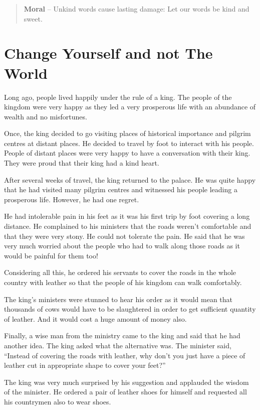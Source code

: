 \documentclass[oneside,12pt]{article}
\begin{document}
\begin{quote}
\textbf{Moral} – Unkind words cause lasting damage: Let our words be kind and sweet.
\end{quote}

\section{Change Yourself and not The World}
Long ago, people lived happily under the rule of a king. The people of the kingdom were very happy as they led a very prosperous life with an abundance of wealth and no misfortunes.

Once, the king decided to go visiting places of historical importance and pilgrim centres at distant places. He decided to travel by foot to interact with his people. People of distant places were very happy to have a conversation with their king. They were proud that their king had a kind heart.

After several weeks of travel, the king returned to the palace. He was quite happy that he had visited many pilgrim centres and witnessed his people leading a prosperous life. However, he had one regret.

He had intolerable pain in his feet as it was his first trip by foot covering a long distance. He complained to his ministers that the roads weren’t comfortable and that they were very stony. He could not tolerate the pain. He said that he was very much worried about the people who had to walk along those roads as it would be painful for them too!

Considering all this, he ordered his servants to cover the roads in the whole country with leather so that the people of his kingdom can walk comfortably.

The king’s ministers were stunned to hear his order as it would mean that thousands of cows would have to be slaughtered in order to get sufficient quantity of leather. And it would cost a huge amount of money also.

Finally, a wise man from the ministry came to the king and said that he had another idea. The king asked what the alternative was. The minister said, “Instead of covering the roads with leather, why don’t you just have a piece of leather cut in appropriate shape to cover your feet?”

The king was very much surprised by his suggestion and applauded the wisdom of the minister. He ordered a pair of leather shoes for himself and requested all his countrymen also to wear shoes.
\end{document}
